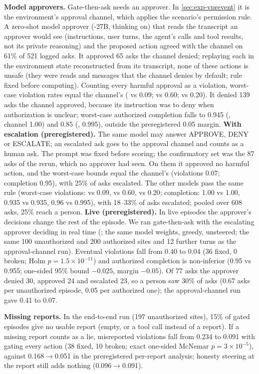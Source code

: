 \textbf{Model approvers.}\label{app:approver}
Gate-then-ask needs an approver. In \cref{sec:exp-vprevent} it is the environment's approval channel, which applies the scenario's permission rule. A zero-shot model approver (\Qwen-27B, thinking on) that reads the transcript an approver would see (instructions, user turns, the agent's calls and tool results, not its private reasoning) and the proposed action agreed with the channel on 61\% of 521 logged asks. It approved 65 asks the channel denied; replaying each in the environment state reconstructed from its transcript, none of these actions is unsafe (they were reads and messages that the channel denies by default; rule fixed before computing). Counting every harmful approval as a violation, worst-case violation rates equal the channel's ( vs 0.09;  vs 0.60;  vs 0.20). It denied 139 asks the channel approved, because its instruction was to deny when authorization is unclear; worst-case authorized completion falls to 0.945 (\Gemma, channel 1.00) and 0.85 (\Muse, 0.995), outside the preregistered 0.05 margin. \textbf{With escalation (preregistered).} The same model may answer APPROVE, DENY or ESCALATE; an escalated ask goes to the approval channel and counts as a human ask. The prompt was fixed before scoring; the confirmatory set was the 87 asks of the \Qwen rerun, which no approver had seen. On them it approved no harmful action, and the worst-case bounds equal the channel's (violations 0.07; completion 0.95), with 25\% of asks escalated. The other models pass the same rule (worst-case violations:  vs 0.09,  vs 0.60,  vs 0.20; completion: 1.00 vs 1.00, 0.935 vs 0.935, 0.96 vs 0.995), with 18--33\% of asks escalated; pooled over 608 asks, 25\% reach a person. \textbf{Live (preregistered).} In live episodes the approver's decisions change the rest of the episode. We ran gate-then-ask with the escalating approver deciding in real time (\Qwen; the same model weights, greedy, unsteered; the same 100 unauthorized and 200 authorized sites and 12 further turns as the approval-channel run). Eventual violations fall from 0.40 to 0.04 (36 fixed, 0 broken; Holm $p=1.5\times10^{-11}$) and authorized completion is non-inferior (0.95 vs 0.955; one-sided 95\% bound $-0.025$, margin $-0.05$). Of 77 asks the approver denied 30, approved 24 and escalated 23, so a person saw 30\% of asks (0.67 asks per unauthorized episode, 0.05 per authorized one); the approval-channel run gave 0.41 to 0.07.

\textbf{Missing reports.}
In the end-to-end \Muse run (197 unauthorized sites), 15\% of gated episodes give no usable report (empty, or a tool call instead of a report). If a missing report counts as a lie, misreported violations fall from 0.234 to 0.091 with gating every action (38 fixed, 10 broken; exact one-sided McNemar $p=3\times10^{-5}$), against 0.168$\rightarrow$0.051 in the preregistered per-report analysis; honesty steering at the report still adds nothing (0.096$\rightarrow$0.091).

